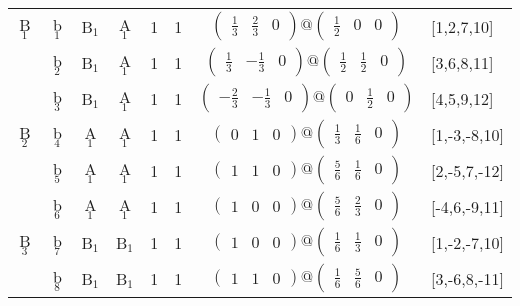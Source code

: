 \documentclass[fleqn,10pt,landscape]{article}
\begin{document}
\begin{itemize}
\begin{center}
\begin{longtable}{cc|cc|c|c|c|l}
B$_{1}$ & b$_{1}$ & B$_{1}$ & A$_{1}$ & 1 & 1 & $\begin{pmatrix} \frac{1}{3} & \frac{2}{3} & 0 \end{pmatrix}@\begin{pmatrix} \frac{1}{2} & 0 & 0 \end{pmatrix}$ & [1,2,7,10] \\
& b$_{2}$ & B$_{1}$ & A$_{1}$ & 1 & 1 & $\begin{pmatrix} \frac{1}{3} & - \frac{1}{3} & 0 \end{pmatrix}@\begin{pmatrix} \frac{1}{2} & \frac{1}{2} & 0 \end{pmatrix}$ & [3,6,8,11] \\
& b$_{3}$ & B$_{1}$ & A$_{1}$ & 1 & 1 & $\begin{pmatrix} - \frac{2}{3} & - \frac{1}{3} & 0 \end{pmatrix}@\begin{pmatrix} 0 & \frac{1}{2} & 0 \end{pmatrix}$ & [4,5,9,12] \\ \hline
B$_{2}$ & b$_{4}$ & A$_{1}$ & A$_{1}$ & 1 & 1 & $\begin{pmatrix} 0 & 1 & 0 \end{pmatrix}@\begin{pmatrix} \frac{1}{3} & \frac{1}{6} & 0 \end{pmatrix}$ & [1,-3,-8,10] \\
& b$_{5}$ & A$_{1}$ & A$_{1}$ & 1 & 1 & $\begin{pmatrix} 1 & 1 & 0 \end{pmatrix}@\begin{pmatrix} \frac{5}{6} & \frac{1}{6} & 0 \end{pmatrix}$ & [2,-5,7,-12] \\
& b$_{6}$ & A$_{1}$ & A$_{1}$ & 1 & 1 & $\begin{pmatrix} 1 & 0 & 0 \end{pmatrix}@\begin{pmatrix} \frac{5}{6} & \frac{2}{3} & 0 \end{pmatrix}$ & [-4,6,-9,11] \\ \hline
B$_{3}$ & b$_{7}$ & B$_{1}$ & B$_{1}$ & 1 & 1 & $\begin{pmatrix} 1 & 0 & 0 \end{pmatrix}@\begin{pmatrix} \frac{1}{6} & \frac{1}{3} & 0 \end{pmatrix}$ & [1,-2,-7,10] \\
& b$_{8}$ & B$_{1}$ & B$_{1}$ & 1 & 1 & $\begin{pmatrix} 1 & 1 & 0 \end{pmatrix}@\begin{pmatrix} \frac{1}{6} & \frac{5}{6} & 0 \end{pmatrix}$ & [3,-6,8,-11] \\

\end{longtable}
\end{center}
\end{itemize}
\end{document}
